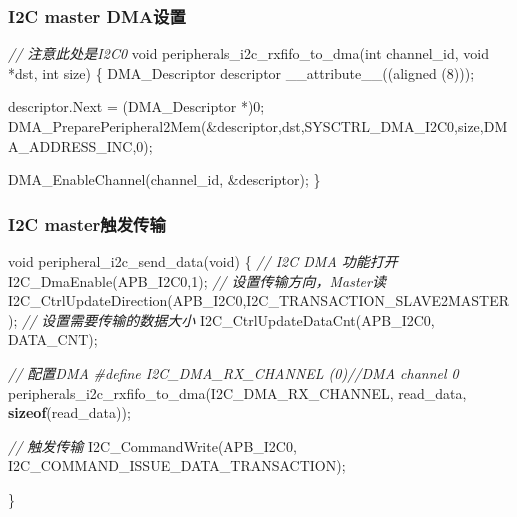 \documentclass[
  12pt,
]{book}
\newenvironment{Shaded}{\begin{snugshade}}{\end{snugshade}}
\newcommand{\CommentTok}[1]{\textcolor[rgb]{0.56,0.35,0.01}{\textit{#1}}}
\newcommand{\DataTypeTok}[1]{\textcolor[rgb]{0.13,0.29,0.53}{#1}}
\newcommand{\DecValTok}[1]{\textcolor[rgb]{0.00,0.00,0.81}{#1}}
\newcommand{\KeywordTok}[1]{\textcolor[rgb]{0.13,0.29,0.53}{\textbf{#1}}}
\newcommand{\NormalTok}[1]{#1}
\newcommand{\PreprocessorTok}[1]{\textcolor[rgb]{0.56,0.35,0.01}{\textit{#1}}}
\begin{document}
\hypertarget{i2c-master-dmaux8bbeux7f6e}{%
\subsubsection{I2C master DMA设置}\label{i2c-master-dmaux8bbeux7f6e}}

\begin{Shaded}
\begin{Highlighting}[]
\CommentTok{// 注意此处是I2C0}
\DataTypeTok{void}\NormalTok{ peripherals_i2c_rxfifo_to_dma(}\DataTypeTok{int}\NormalTok{ channel_id, }\DataTypeTok{void}\NormalTok{ *dst, }\DataTypeTok{int}\NormalTok{ size)}
\NormalTok{\{}
\NormalTok{  DMA_Descriptor descriptor __attribute__((aligned (}\DecValTok{8}\NormalTok{)));}

\NormalTok{  descriptor.Next = (DMA_Descriptor *)}\DecValTok{0}\NormalTok{;}
\NormalTok{  DMA_PreparePeripheral2Mem(&descriptor,dst,SYSCTRL_DMA_I2C0,size,DMA_ADDRESS_INC,}\DecValTok{0}\NormalTok{);}

\NormalTok{  DMA_EnableChannel(channel_id, &descriptor);}
\NormalTok{\}}
\end{Highlighting}
\end{Shaded}

\hypertarget{i2c-masterux89e6ux53d1ux4f20ux8f93-2}{%
\subsubsection{I2C master触发传输}\label{i2c-masterux89e6ux53d1ux4f20ux8f93-2}}

\begin{Shaded}
\begin{Highlighting}[]
\DataTypeTok{void}\NormalTok{ peripheral_i2c_send_data(}\DataTypeTok{void}\NormalTok{)}
\NormalTok{\{}
  \CommentTok{// I2C DMA 功能打开}
\NormalTok{  I2C_DmaEnable(APB_I2C0,}\DecValTok{1}\NormalTok{);}
  \CommentTok{// 设置传输方向，Master读}
\NormalTok{  I2C_CtrlUpdateDirection(APB_I2C0,I2C_TRANSACTION_SLAVE2MASTER);}
  \CommentTok{// 设置需要传输的数据大小}
\NormalTok{  I2C_CtrlUpdateDataCnt(APB_I2C0, DATA_CNT);}

  \CommentTok{// 配置DMA}
  \PreprocessorTok{#define I2C_DMA_RX_CHANNEL   (0)}\CommentTok{//DMA channel 0}
\NormalTok{  peripherals_i2c_rxfifo_to_dma(I2C_DMA_RX_CHANNEL, read_data, }\KeywordTok{sizeof}\NormalTok{(read_data));}
  
  \CommentTok{// 触发传输}
\NormalTok{  I2C_CommandWrite(APB_I2C0, I2C_COMMAND_ISSUE_DATA_TRANSACTION);}
  
\NormalTok{\}}
\end{Highlighting}
\end{Shaded}
\end{document}
